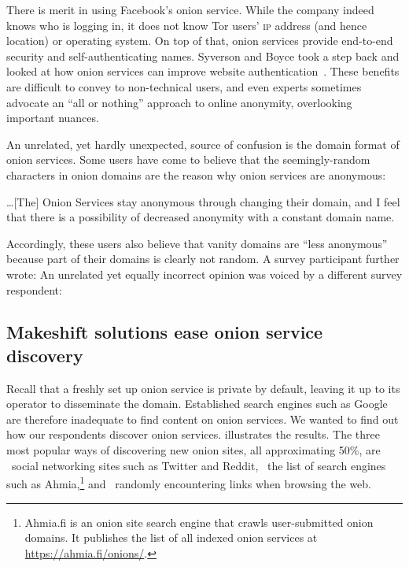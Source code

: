 There is merit in using Facebook's onion service.  While the company indeed
knows who is logging in, it does not know Tor users' \textsc{ip} address (and
hence location) or operating system.  On top of that, onion services provide
end-to-end security and self-authenticating names.  Syverson and Boyce took a
step back and looked at how onion services can improve website
authentication~\cite{Syverson2015a}.  These benefits are difficult to convey to
non-technical users, and even experts sometimes advocate an ``all or nothing''
approach to online anonymity, overlooking important nuances.

An unrelated, yet hardly unexpected, source of confusion is the domain format of
onion services.  Some users have come to believe that the seemingly-random
characters in onion domains are the reason why onion services are anonymous:

\begin{displayquote}
\ldots [The] Onion Services stay anonymous through changing their domain, and I
feel that there is a possibility of decreased anonymity with a constant domain
name.
\end{displayquote}

Accordingly, these users also believe that vanity domains are ``less anonymous''
because part of their domains is clearly not random.  A survey participant
further wrote:   An unrelated yet
equally incorrect opinion was voiced by a different survey respondent:

\subsection{Makeshift solutions ease onion service discovery}
\label{sec:discovery}

Recall that a freshly set up onion service is private by default, leaving it up
to its operator to disseminate the domain.  Established search engines such as
Google are therefore inadequate to find content on onion services.  We wanted to
find out how our respondents discover onion services.
 illustrates the results.  The three most popular ways
of discovering new onion sites, all approximating 50\%, are \first~social
networking sites such as Twitter and Reddit, \second~the list of search engines
such as Ahmia,\footnote{Ahmia.fi is an onion site search engine that crawls
user-submitted onion domains.  It publishes the list of all indexed onion
services at \url{https://ahmia.fi/onions/}.} and \third~randomly encountering
links when browsing the web.

